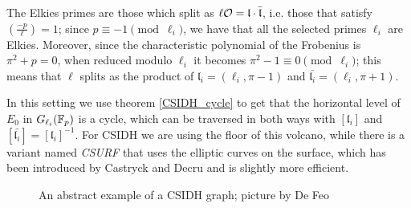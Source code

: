 The Elkies primes are those which split as $\ell\mathcal{O}=\mathfrak{l}\cdot\bar{\mathfrak{l}}$, i.e. those that satisfy $\left( \frac{-p}{\ell} \right)=1$; since $p\equiv-1\pmod{\ell_i}$, we have that all the selected primes $\ell_i$ are Elkies. Moreover, since the characteristic polynomial of the Frobenius is $\pi^2+p=0$, when reduced modulo $\ell_i$ it becomes $\pi^2-1\equiv0\pmod{\ell_i}$; this means that $\ell$ splits as the product of $\mathfrak{l}_i=(\ell_i, \pi-1)$ and $\bar{\mathfrak{l}_i}=(\ell_i, \pi+1)$.

In this setting we use theorem \ref{CSIDH_cycle} to get that the horizontal level of $E_0$ in $G_{\ell_i}(\mathbb{F}_p)$ is a cycle, which can be traversed in both ways with $[\mathfrak{l}_i]$ and $[\bar{\mathfrak{l}_i}]=[\mathfrak{l}_i]^{-1}$. For CSIDH we are using the floor of this volcano, while there is a variant named \emph{CSURF} that uses the elliptic curves on the surface, which has been introduced by Castryck and Decru \cite{CSURF} and is slightly more efficient.

\begin{figure}
    \centering
    \caption{An abstract example of a CSIDH graph; picture by De Feo}
    \label{picture_CSIDH}
\end{figure}

